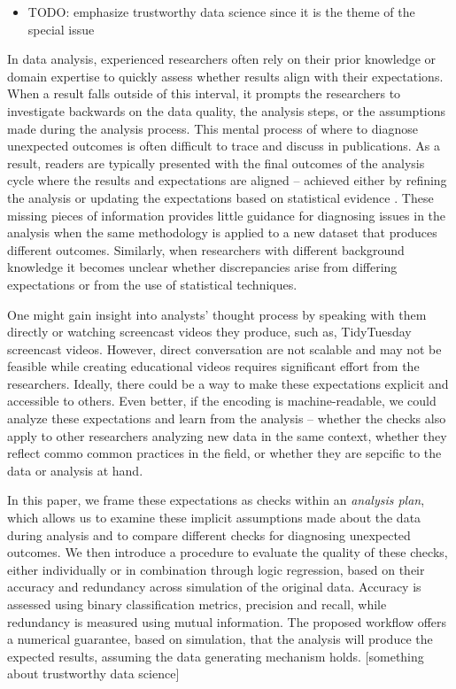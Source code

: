 \documentclass[
  12pt,
]{interact}
\providecommand{\tightlist}{%
  \setlength{\itemsep}{0pt}\setlength{\parskip}{0pt}}\usepackage{longtable,booktabs,array}
\begin{document}
\begin{itemize}
\tightlist
\item
  TODO: emphasize trustworthy data science since it is the theme of the
  special issue
\end{itemize}

In data analysis, experienced researchers often rely on their prior
knowledge or domain expertise to quickly assess whether results align
with their expectations. When a result falls outside of this interval,
it prompts the researchers to investigate backwards on the data quality,
the analysis steps, or the assumptions made during the analysis process.
This mental process of where to diagnose unexpected outcomes is often
difficult to trace and discuss in publications. As a result, readers are
typically presented with the final outcomes of the analysis cycle where
the results and expectations are aligned -- achieved either by refining
the analysis or updating the expectations based on statistical evidence
\citep{grolemund_cognitive_2014}. These missing pieces of information
provides little guidance for diagnosing issues in the analysis when the
same methodology is applied to a new dataset that produces different
outcomes. Similarly, when researchers with different background
knowledge it becomes unclear whether discrepancies arise from differing
expectations or from the use of statistical techniques.

One might gain insight into analysts' thought process by speaking with
them directly or watching screencast videos they produce, such as,
TidyTuesday screencast videos. However, direct conversation are not
scalable and may not be feasible while creating educational videos
requires significant effort from the researchers. Ideally, there could
be a way to make these expectations explicit and accessible to others.
Even better, if the encoding is machine-readable, we could analyze these
expectations and learn from the analysis -- whether the checks also
apply to other researchers analyzing new data in the same context,
whether they reflect commo common practices in the field, or whether
they are sepcific to the data or analysis at hand.

In this paper, we frame these expectations as checks within an
\emph{analysis plan}, which allows us to examine these implicit
assumptions made about the data during analysis and to compare different
checks for diagnosing unexpected outcomes. We then introduce a procedure
to evaluate the quality of these checks, either individually or in
combination through logic regression, based on their accuracy and
redundancy across simulation of the original data. Accuracy is assessed
using binary classification metrics, precision and recall, while
redundancy is measured using mutual information. The proposed workflow
offers a numerical guarantee, based on simulation, that the analysis
will produce the expected results, assuming the data generating
mechanism holds. {[}something about trustworthy data science{]}
\end{document}

